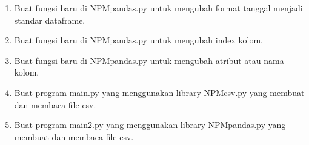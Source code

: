\begin{enumerate}
\begin{enumerate}
	\item  Buat fungsi baru di NPMpandas.py untuk mengubah format tanggal menjadi standar dataframe.
	
	
	
	\item Buat fungsi baru di NPMpandas.py untuk mengubah index kolom.
	
	
	
	\item Buat fungsi baru di NPMpandas.py untuk mengubah atribut atau nama kolom.
	
	
	
	\item Buat program main.py yang menggunakan library NPMcsv.py yang membuat dan membaca file csv.
	
	
	
	\item Buat program main2.py yang menggunakan library NPMpandas.py yang membuat dan membaca file csv.
	
	
	
\end{enumerate}


\end{enumerate}

